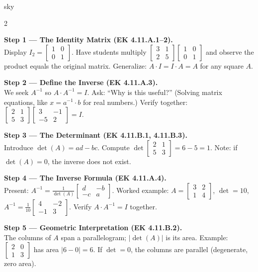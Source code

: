 \documentclass[10pt]{article}
\begin{document}
\begin{skillbox}[Lesson]{sky}
\begin{multicols}{2}

\textbf{Step 1 --- The Identity Matrix (EK 4.11.A.1--2).}\\
Display $I_2 = \begin{bmatrix}1&0\\0&1\end{bmatrix}$.
Have students multiply $\begin{bmatrix}3&1\\2&5\end{bmatrix}\begin{bmatrix}1&0\\0&1\end{bmatrix}$
and observe the product equals the original matrix.
Generalize: $A \cdot I = I \cdot A = A$ for any square $A$.

\textbf{Step 2 --- Define the Inverse (EK 4.11.A.3).}\\
We seek $A^{-1}$ so $A \cdot A^{-1} = I$. Ask: ``Why is this useful?''
(Solving matrix equations, like $x = a^{-1} \cdot b$ for real numbers.)
Verify together: $\begin{bmatrix}2&1\\5&3\end{bmatrix}\begin{bmatrix}3&-1\\-5&2\end{bmatrix}=I$.

\columnbreak

\textbf{Step 3 --- The Determinant (EK 4.11.B.1, 4.11.B.3).}\\
Introduce $\det(A) = ad - bc$.
Compute $\det\begin{bmatrix}2&1\\5&3\end{bmatrix} = 6-5 = 1$.
Note: if $\det(A) = 0$, the inverse does not exist.

\textbf{Step 4 --- The Inverse Formula (EK 4.11.A.4).}\\
Present: $A^{-1} = \tfrac{1}{\det(A)}\begin{bmatrix}d&-b\\-c&a\end{bmatrix}$.
Worked example: $A=\begin{bmatrix}3&2\\1&4\end{bmatrix}$, $\det=10$,
$A^{-1}=\tfrac{1}{10}\begin{bmatrix}4&-2\\-1&3\end{bmatrix}$.
Verify $A \cdot A^{-1} = I$ together.

\textbf{Step 5 --- Geometric Interpretation (EK 4.11.B.2).}\\
The columns of $A$ span a parallelogram; $|\det(A)|$ is its area.
Example: $\begin{bmatrix}2&0\\1&3\end{bmatrix}$ has area $|6-0|=6$.
If $\det=0$, the columns are parallel (degenerate, zero area).

\end{multicols}
\end{skillbox}
\end{document}
